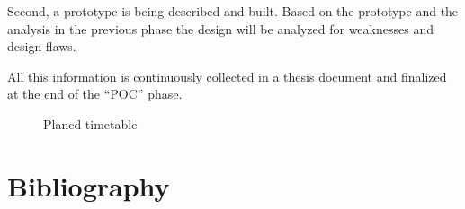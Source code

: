 \documentclass[twocolumn,a4paper,10pt,english]{scrartcl}
\begin{document}
Second, a prototype is being described and built. Based on the prototype and the analysis in the previous phase the design will be analyzed for weaknesses and design flaws.\par
All this information is continuously collected in a thesis document and finalized at the end of the ``POC'' phase.\par
\begin{figure}[H]%
\caption{Planed timetable}%
\label{Gant chart}%
\end{figure}

\section{Bibliography}
\printbibliography[title={},heading=none]
\end{document}
